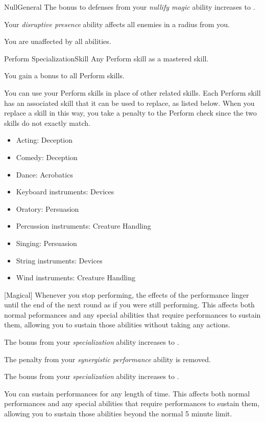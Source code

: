 \begin{feat}{Null}{General}
         The bonus to defenses from your \textit{nullify magic} ability increases to .

         Your \textit{disruptive presence} ability affects all enemies in a \arealarge radius  from you.

         You are unaffected by all  abilities.
    \end{feat}

    \begin{feat}{Perform Specialization}{Skill}
        \featpre Any Perform skill as a mastered skill.

         You gain a  bonus to all Perform skills.

         You can use your Perform skills in place of other related skills.
        Each Perform skill has an associated skill that it can be used to replace, as listed below.
        When you replace a skill in this way, you take a  penalty to the Perform check since the two skills do not exactly match.
        \begin{itemize}
            \item Acting: Deception
            \item Comedy: Deception
            \item Dance: Acrobatics
            \item Keyboard instruments: Devices
            \item Oratory: Persuasion
            \item Percussion instruments: Creature Handling
            \item Singing: Persuasion
            \item String instruments: Devices
            \item Wind instruments: Creature Handling
        \end{itemize}

        [Magical] Whenever you stop performing, the effects of the performance linger until the end of the next round as if you were still performing.
        This affects both normal peformances and any special abilities that require performances to sustain them, allowing you to sustain those abilities without taking any actions.

         The bonus from your \textit{specialization} ability increases to .

         The penalty from your \textit{synergistic performance} ability is removed.

         The bonus from your \textit{specialization} ability increases to .

         You can sustain performances for any length of time.
        This affects both normal performances and any special abilities that require performances to sustain them, allowing you to sustain those abilities beyond the normal 5 minute limit.
    \end{feat}

